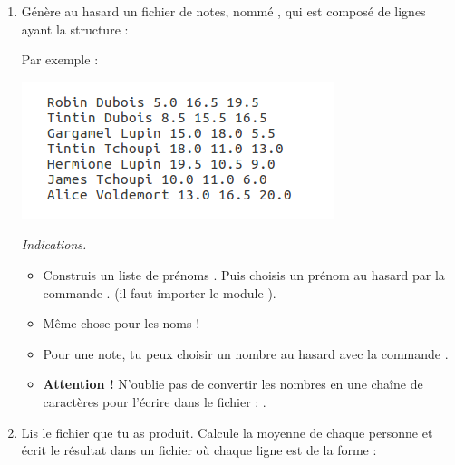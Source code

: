\documentclass[11pt,class=report,crop=false]{standalone}
\begin{document}
\begin{activite}


\begin{enumerate}
  \item Génère au hasard un fichier de notes, nommé , qui est composé de lignes ayant la structure :\\
  \centerline{} 
  
  Par exemple :
\begin{center}
\includegraphics[scale=0.7]{ecran-fichiers-1a}
\end{center} 

  \emph{Indications.}
  \begin{itemize}
    	\item Construis un liste de prénoms . Puis choisis un prénom au hasard par la commande
    	. (il faut importer le module ).
    	
    	\item Même chose pour les noms ! 
    	
    	\item Pour une note, tu peux choisir un nombre au hasard avec la commande  . 
    	
    	\item \textbf{Attention !} N'oublie pas de convertir les nombres en une chaîne de caractères pour l'écrire dans le fichier : .
    	
   \end{itemize}
    
  
  \item Lis le fichier  que tu as produit. Calcule la moyenne de chaque personne et écrit le résultat dans un fichier  où chaque ligne est de la forme :\\
  \centerline{} 
  

\end{enumerate}
\end{activite}
\end{document}
